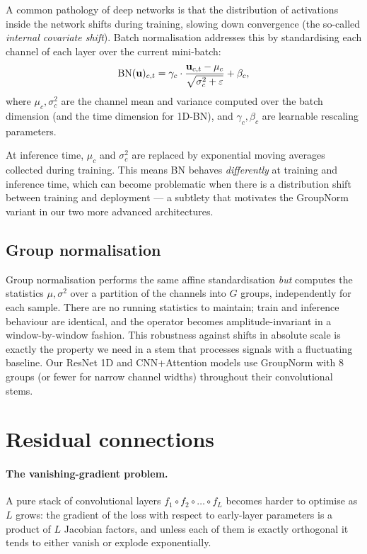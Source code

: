 A common pathology of deep networks is that the distribution of
activations inside the network shifts during training, slowing down
convergence (the so-called \emph{internal covariate shift}). Batch
normalisation \cite{ioffe2015batch} addresses this by standardising
each channel of each layer over the current mini-batch:
\begin{equation}
    \operatorname{BN}(\mathbf{u})_{c, t} = \gamma_c \cdot \frac{\mathbf{u}_{c, t} - \mu_c}{\sqrt{\sigma_c^2 + \varepsilon}} + \beta_c,
    \label{eq:bn}
\end{equation}
where $\mu_c, \sigma_c^2$ are the channel mean and variance computed
over the batch dimension (and the time dimension for 1D-BN), and
$\gamma_c, \beta_c$ are learnable rescaling parameters.

At inference time, $\mu_c$ and $\sigma_c^2$ are replaced by exponential
moving averages collected during training. This means BN behaves
\emph{differently} at training and inference time, which can become
problematic when there is a distribution shift between training and
deployment --- a subtlety that motivates the GroupNorm variant in our
two more advanced architectures.

\subsection{Group normalisation}
\label{sec:gn-theory}

Group normalisation \cite{wu2018group} performs the same affine
standardisation \emph{but} computes the statistics
$\mu, \sigma^2$ over a partition of the channels into $G$ groups,
independently for each sample. There are no running statistics to
maintain; train and inference behaviour are identical, and the
operator becomes amplitude-invariant in a window-by-window fashion.
This robustness against shifts in absolute scale is exactly the
property we need in a stem that processes signals with a fluctuating
baseline. Our ResNet 1D and CNN+Attention models use GroupNorm with $8$
groups (or fewer for narrow channel widths) throughout their
convolutional stems.

\section{Residual connections}
\label{sec:resnet-theory}

\paragraph{The vanishing-gradient problem.}
A pure stack of convolutional layers $f_1 \circ f_2 \circ \dots \circ f_L$
becomes harder to optimise as $L$ grows: the gradient of the loss with
respect to early-layer parameters is a product of $L$ Jacobian factors,
and unless each of them is exactly orthogonal it tends to either
vanish or explode exponentially.


